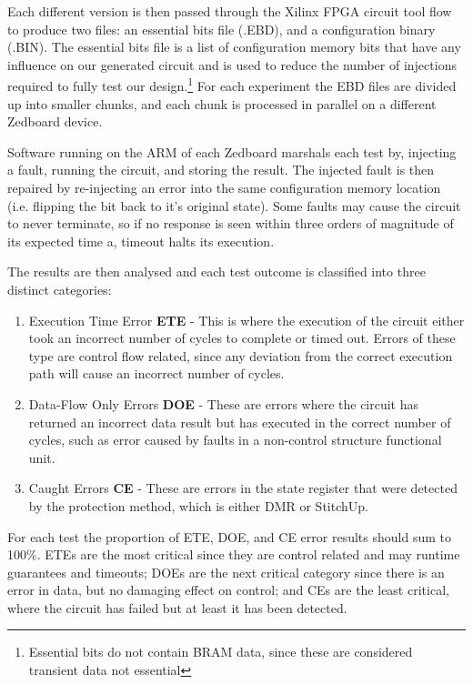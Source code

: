 Each different version is then passed through the Xilinx FPGA circuit tool flow to produce
two files: an essential bits file (.EBD), and a configuration binary (.BIN).
The essential bits file is a list of configuration memory bits that have any
influence on our generated circuit and is used to reduce the number of injections
required to fully test our design.\footnote{Essential bits do not contain BRAM data,
since these are considered transient data not essential}
For each experiment the EBD files are divided up into smaller chunks, and each chunk is
processed in parallel on a different Zedboard device.

Software running on the ARM of each Zedboard marshals each test by, injecting a fault,
running the circuit, and storing the result.
The injected fault is then repaired by re-injecting an error into the
same configuration memory location (i.e. flipping the bit back to it's original state).
Some faults may cause the circuit to never terminate, so if no response is seen within three orders
of magnitude of its expected time a, timeout halts its execution.

The results are then analysed and each test outcome is classified into three distinct categories:

\begin{enumerate}
\setlength{\itemsep}{1pt}
\setlength{\parskip}{0pt}
\setlength{\parsep}{0pt}
\item Execution Time Error \textbf{ETE} - This is where the execution of the circuit either took
an incorrect number of cycles to complete or timed out. Errors of these type are
control flow related, since any deviation from the correct execution path will cause
an incorrect number of cycles.
\item Data-Flow Only Errors \textbf{DOE} - These are errors where the circuit has returned an incorrect
data result but has executed in the correct number of cycles, such as error caused
by faults in a non-control structure functional unit.
\item Caught Errors \textbf{CE} - These are errors in the state register that were detected by the protection method, which is
either DMR or StitchUp.
\end{enumerate}

For each test the proportion of ETE, DOE, and CE error results should sum to 100\%.
ETEs are the most critical since they are control related and may runtime guarantees and timeouts;
DOEs are the next critical category since there is an error in data, but no damaging effect on control;
and CEs are the least critical, where the circuit has failed but at least it has been detected.
